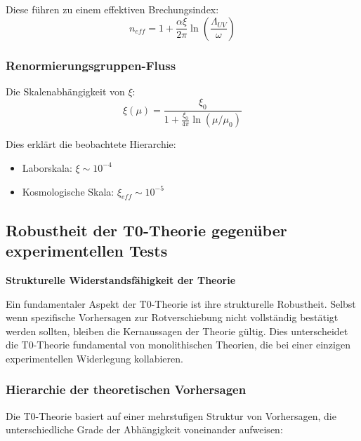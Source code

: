 \documentclass[12pt,a4paper]{article}
\theoremstyle{definition}
\begin{document}
Diese führen zu einem effektiven Brechungsindex:
\begin{equation}
	n_{eff} = 1 + \frac{\alpha\xi}{2\pi} \ln\left(\frac{\Lambda_{UV}}{\omega}\right)
\end{equation}

\subsubsection{Renormierungsgruppen-Fluss}

Die Skalenabhängigkeit von \(\xi\):
\begin{equation}
	\xi(\mu) = \frac{\xi_0}{1 + \frac{\xi_0}{4\pi}\ln(\mu/\mu_0)}
\end{equation}

Dies erklärt die beobachtete Hierarchie:
\begin{itemize}
	\item Laborskala: \(\xi \sim 10^{-4}\)
	\item Kosmologische Skala: \(\xi_{eff} \sim 10^{-5}\)
\end{itemize}

\subsection{Robustheit der T0-Theorie gegenüber experimentellen Tests}
\label{subsec:robustness}

\begin{important}
	\textbf{Strukturelle Widerstandsfähigkeit der Theorie}
	
	Ein fundamentaler Aspekt der T0-Theorie ist ihre strukturelle Robustheit. Selbst wenn spezifische Vorhersagen zur Rotverschiebung nicht vollständig bestätigt werden sollten, bleiben die Kernaussagen der Theorie gültig. Dies unterscheidet die T0-Theorie fundamental von monolithischen Theorien, die bei einer einzigen experimentellen Widerlegung kollabieren.
\end{important}

\subsubsection{Hierarchie der theoretischen Vorhersagen}

Die T0-Theorie basiert auf einer mehrstufigen Struktur von Vorhersagen, die unterschiedliche Grade der Abhängigkeit voneinander aufweisen:
\end{document}
